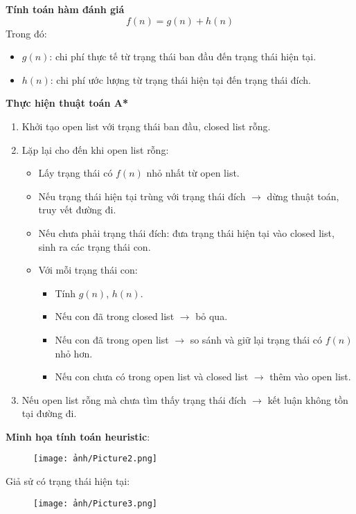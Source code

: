 \documentclass{article}
\begin{document}
\textbf{Tính toán hàm đánh giá}
\[
f(n) = g(n) + h(n)
\]
Trong đó:
\begin{itemize}
    \item $g(n)$: chi phí thực tế từ trạng thái ban đầu đến trạng thái hiện tại.
    \item $h(n)$: chi phí ước lượng từ trạng thái hiện tại đến trạng thái đích.
\end{itemize}

\textbf{Thực hiện thuật toán A*}
\begin{enumerate}
    \item Khởi tạo open list với trạng thái ban đầu, closed list rỗng.
    \item Lặp lại cho đến khi open list rỗng:
    \begin{itemize}
        \item Lấy trạng thái có $f(n)$ nhỏ nhất từ open list.
        \item Nếu trạng thái hiện tại trùng với trạng thái đích $\rightarrow$ dừng thuật toán, truy vết đường đi.
        \item Nếu chưa phải trạng thái đích: đưa trạng thái hiện tại vào closed list, sinh ra các trạng thái con.
        \item Với mỗi trạng thái con:
        \begin{itemize}
            \item Tính $g(n)$, $h(n)$.
            \item Nếu con đã trong closed list $\rightarrow$ bỏ qua.
            \item Nếu con đã trong open list $\rightarrow$ so sánh và giữ lại trạng thái có $f(n)$ nhỏ hơn.
            \item Nếu con chưa có trong open list và closed list $\rightarrow$ thêm vào open list.
        \end{itemize}
    \end{itemize}
    \item Nếu open list rỗng mà chưa tìm thấy trạng thái đích $\rightarrow$ kết luận không tồn tại đường đi.
\end{enumerate}

\textbf{Minh họa tính toán heuristic}:

\begin{figure}[h!]
\centering
\texttt{[image: ảnh/Picture2.png]}
\end{figure}

Giả sử có trạng thái hiện tại:
\begin{figure}[h!]
\centering
\texttt{[image: ảnh/Picture3.png]}
\end{figure}
\end{document}
